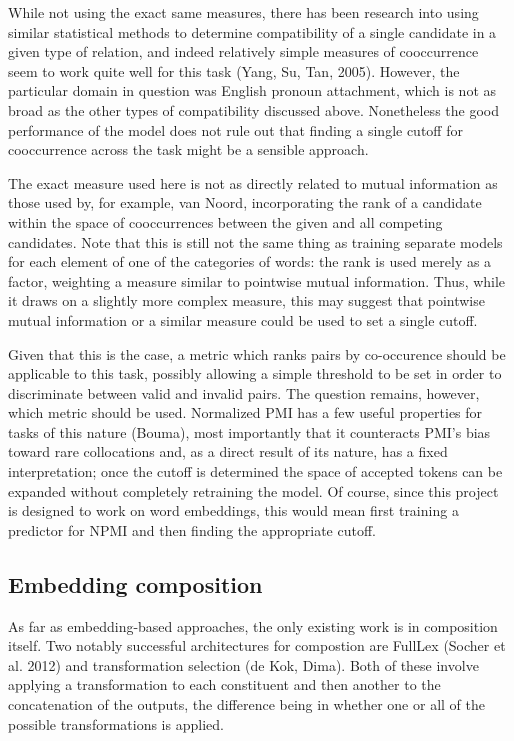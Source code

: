\documentclass[a4paper, 11pt]{scrartcl}
\begin{document}
While not using the exact same measures, there has been research into using similar statistical methods to determine compatibility of a single candidate in a given type of relation, and indeed relatively simple measures of cooccurrence seem to work quite well for this task (Yang, Su, Tan, 2005). However, the particular domain in question was English pronoun attachment, which is not as broad as the other types of compatibility discussed above. Nonetheless the good performance of the model does not rule out that finding a single cutoff for cooccurrence across the task might be a sensible approach.

The exact measure used here is not as directly related to mutual information as those used by, for example, van Noord, incorporating the rank of a candidate within the space of cooccurrences between the given and all competing candidates. Note that this is still not the same thing as training separate models for each element of one of the categories of words: the rank is used merely as a factor, weighting a measure similar to pointwise mutual information. Thus, while it draws on a slightly more complex measure, this may suggest that pointwise mutual information or a similar measure could be used to set a single cutoff.

Given that this is the case, a metric which ranks pairs by co-occurence should be applicable to this task, possibly allowing a simple threshold to be set in order to discriminate between valid and invalid pairs. The question remains, however, which metric should be used. Normalized PMI has a few useful properties for tasks of this nature (Bouma), most importantly that it counteracts PMI's bias toward rare collocations and, as a direct result of its nature, has a fixed interpretation; once the cutoff is determined the space of accepted tokens can be expanded without completely retraining the model. Of course, since this project is designed to work on word embeddings, this would mean first training a predictor for NPMI and then finding the appropriate cutoff.

\subsection{Embedding composition}

As far as embedding-based approaches, the only existing work is in composition itself. Two notably successful architectures for compostion are FullLex (Socher et al. 2012) and transformation selection (de Kok, Dima). Both of these involve applying a transformation to each constituent and then another to the concatenation of the outputs, the difference being in whether one or all of the possible transformations is applied.
\end{document}
